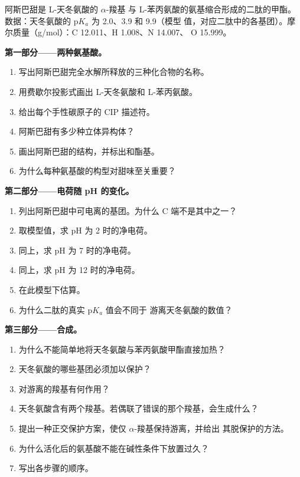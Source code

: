 \begin{problem}
\label{pb:b2:biomolecules:1}
阿斯巴甜是 L-天冬氨酸的 $\alpha$-羧基
与 L-苯丙氨酸的氨基缩合形成的二肽的甲酯。数据：天冬氨酸的 $\mathrm pK_a$ 为 2.0、3.9 和 9.9（模型
值，对应二肽中的各基团）。摩尔质量（\unit{g/mol}）：C 12.011、H 1.008、N 14.007、
O 15.999。

\medskip
\noindent\textbf{第一部分——两种氨基酸。}
\begin{enumerate}
  \item 写出阿斯巴甜完全水解所释放的三种化合物的名称。
  \item 用费歇尔投影式画出 L-天冬氨酸和 L-苯丙氨酸。
  \item 给出每个手性碳原子的 CIP 描述符。
  \item 阿斯巴甜有多少种立体异构体？
  \item 画出阿斯巴甜的结构，并标出和酯基。
  \item 为什么每种氨基酸的构型对甜味至关重要？
\end{enumerate}

\medskip
\noindent\textbf{第二部分——电荷随 pH 的变化。}
\begin{enumerate}[resume]
  \item 列出阿斯巴甜中可电离的基团。为什么 C 端不是其中之一？
  \item 取模型值，求 pH 为 2 时的净电荷。
  \item 同上，求 pH 为 7 时的净电荷。
  \item 同上，求 pH 为 12 时的净电荷。
  \item 在此模型下估算。
  \item 为什么二肽的真实 $\mathrm pK_a$ 值会不同于
        游离天冬氨酸的数值？
\end{enumerate}

\medskip
\noindent\textbf{第三部分——合成。}
\begin{enumerate}[resume]
  \item 为什么不能简单地将天冬氨酸与苯丙氨酸甲酯直接加热？
  \item 天冬氨酸的哪些基团必须加以保护？
  \item {}对游离的羧基有何作用？
  \item 天冬氨酸含有两个羧基。若偶联了错误的那个羧基，会生成什么？
  \item 提出一种正交保护方案，使仅 $\alpha$-羧基保持游离，并给出
        其脱保护的方法。
  \item 为什么活化后的氨基酸不能在碱性条件下放置过久？
  \item 写出各步骤的顺序。
\end{enumerate}


\end{problem}
